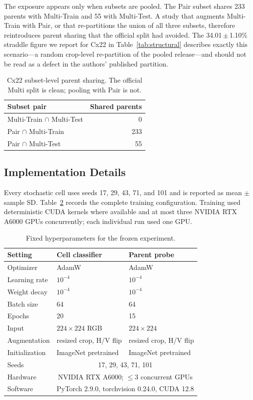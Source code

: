 \documentclass[conference]{IEEEtran}
\newcommand{\meanpm}[2]{#1\,$\pm$\,#2}
\begin{document}
The exposure appears only when subsets are pooled.
The Pair subset shares 233 parents with Multi-Train and 55 with Multi-Test.
A study that augments Multi-Train with Pair, or that re-partitions the union of all three subsets, therefore reintroduces parent sharing that the official split had avoided.
The \meanpm{34.01}{1.10}\% straddle figure we report for Cx22 in Table~\ref{tab:structural} describes exactly this scenario---a random crop-level re-partition of the pooled release---and should not be read as a defect in the authors' published partition.

\begin{table}[t]
\caption{Cx22 subset-level parent sharing. The official Multi split is clean; pooling with Pair is not.}
\label{tab:cx22}
\centering
\scriptsize
\setlength{\tabcolsep}{6pt}
\begin{tabular}{lr}
\toprule
Subset pair & Shared parents \\
\midrule
Multi-Train $\cap$ Multi-Test & 0 \\
Pair $\cap$ Multi-Train & 233 \\
Pair $\cap$ Multi-Test & 55 \\
\bottomrule
\end{tabular}
\end{table}

\subsection{Implementation Details}
Every stochastic cell uses seeds 17, 29, 43, 71, and 101 and is reported as mean $\pm$ sample SD.
Table~\ref{tab:hparams} records the complete training configuration.
Training used deterministic CUDA kernels where available and at most three NVIDIA RTX A6000 GPUs concurrently; each individual run used one GPU.

\begin{table}[t]
\caption{Fixed hyperparameters for the frozen experiment.}
\label{tab:hparams}
\centering
\scriptsize
\setlength{\tabcolsep}{3.5pt}
\begin{tabular}{lll}
\toprule
Setting & Cell classifier & Parent probe \\
\midrule
Optimizer & AdamW & AdamW \\
Learning rate & $10^{-4}$ & $10^{-4}$ \\
Weight decay & $10^{-4}$ & $10^{-4}$ \\
Batch size & 64 & 64 \\
Epochs & 20 & 15 \\
Input & $224\times224$ RGB & $224\times224$ \\
Augmentation & resized crop, H/V flip & resized crop, H/V flip \\
Initialization & ImageNet pretrained & ImageNet pretrained \\
Seeds & \multicolumn{2}{c}{17, 29, 43, 71, 101} \\
Hardware & \multicolumn{2}{c}{NVIDIA RTX A6000; $\leq$3 concurrent GPUs} \\
Software & \multicolumn{2}{c}{PyTorch 2.9.0, torchvision 0.24.0, CUDA 12.8} \\
\bottomrule
\end{tabular}
\end{table}
\end{document}
